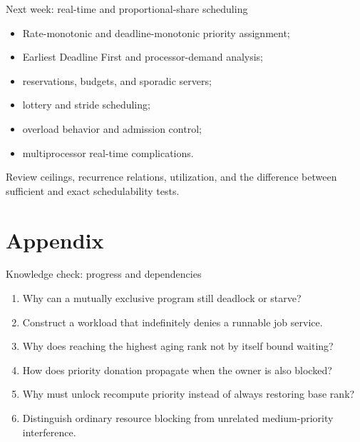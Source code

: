 \documentclass[aspectratio=169,11pt]{beamer}
\begin{document}
\begin{frame}{Next week: real-time and proportional-share scheduling}
  \begin{itemize}
    \item Rate-monotonic and deadline-monotonic priority assignment;
    \item Earliest Deadline First and processor-demand analysis;
    \item reservations, budgets, and sporadic servers;
    \item lottery and stride scheduling;
    \item overload behavior and admission control;
    \item multiprocessor real-time complications.
  \end{itemize}
  \begin{tcolorbox}[title=Preparation,colback=osgreen!5,colframe=osgreen!70]
    Review ceilings, recurrence relations, utilization, and the difference between sufficient and exact schedulability tests.
  \end{tcolorbox}
\end{frame}

\appendix
\section{Appendix}

\begin{frame}{Knowledge check: progress and dependencies}
  \begin{enumerate}
    \item Why can a mutually exclusive program still deadlock or starve?
    \item Construct a workload that indefinitely denies a runnable job service.
    \item Why does reaching the highest aging rank not by itself bound waiting?
    \item How does priority donation propagate when the owner is also blocked?
    \item Why must unlock recompute priority instead of always restoring base rank?
    \item Distinguish ordinary resource blocking from unrelated medium-priority interference.
  \end{enumerate}
\end{frame}
\end{document}
